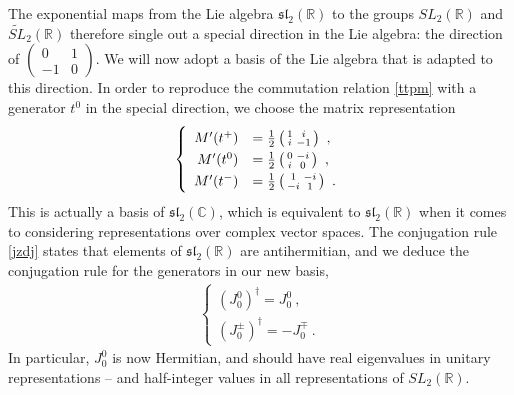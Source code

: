 \documentclass[12pt, a4paper, notitlepage, twoside]{report}
\numberwithin{equation}{section}
\theoremstyle{break}
\begin{document}
The exponential maps from the Lie algebra $\mathfrak{sl}_2(\mathbb{R})$ to the groups $SL_2({\mathbb{R}})$ and $\widetilde{SL}_2(\mathbb{R})$ therefore single out a special direction in the Lie algebra: the direction of $\left(\begin{smallmatrix} 0 & 1 \\ -1 & 0 \end{smallmatrix}\right)$. We will now adopt a basis of the Lie algebra that is adapted to this direction. In order to reproduce the commutation relation \eqref{ttpm} with a generator $t^0$ in the special direction, we choose the matrix representation 
\begin{align}
\renewcommand{\arraystretch}{1.3}
\left\{ \begin{array}{rl}
 M'(t^+)& = \frac12\left(\begin{smallmatrix} 1 & i \\ i& -1 \end{smallmatrix} \right) \ , 
\\
 M'(t^0) &= \frac{1}{2}\left(\begin{smallmatrix} 0 & -i \\ i & 0 \end{smallmatrix}\right)\ ,
\\
M'(t^-) & = \frac12\left(\begin{smallmatrix} 1 & -i \\ -i & 1 \end{smallmatrix} \right) \ .
\end{array} \right.
\label{mpta}
\end{align}
This is actually a basis of $\mathfrak{sl}_2(\mathbb{C})$, which is equivalent to $\mathfrak{sl}_2(\mathbb{R})$ when it comes to considering representations over complex vector spaces. The conjugation rule \eqref{jzdj} states that elements of $\mathfrak{sl}_2(\mathbb{R})$ are antihermitian, and we deduce the conjugation rule for the generators in our new basis, 
\begin{align}
 \left\{\begin{array}{l} (J_0^0)^\dagger = J_0^0\ , \\
         (J_0^\pm)^\dagger = -J_0^\mp \ .
        \end{array}
\right.
\label{jtdj}
\end{align}
In particular, $J_0^0$ is now Hermitian, and should have real eigenvalues in unitary representations -- and half-integer values in all representations of $SL_2(\mathbb{R})$.
\end{document}
